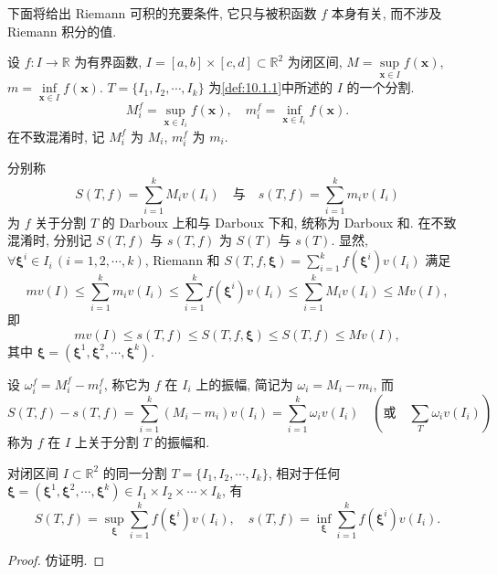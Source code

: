 下面将给出 Riemann 可积的充要条件, 它只与被积函数 $f$ 本身有关, 而不涉及 Riemann 积分的值.

设 $f\colon I \to \mathbb{R}$ 为有界函数, $I = [a, b] \times [c, d] \subset \mathbb{R}^2$ 为闭区间, $M = \sup\limits_{\boldsymbol{x} \in I} f(\boldsymbol{x})$, $m = \inf\limits_{\boldsymbol{x} \in I} f(\boldsymbol{x})$. $T = \{I_1, I_2, \cdots, I_k\}$ 为\cref{def:10.1.1}中所述的 $I$ 的一个分割.
\[
  M_{i}^{f} = \sup_{\boldsymbol{x} \in I_{i}} f(\boldsymbol{x}), \quad m_{i}^{f} = \inf_{\boldsymbol{x} \in I_{i}} f(\boldsymbol{x}).
\]
在不致混淆时, 记 $M_{i}^{f}$ 为 $M_{i}$, $m_{i}^{f}$ 为 $m_{i}$.

分别称
\[
  S(T, f) = \sum_{i=1}^{k} M_{i} v(I_{i}) \quad\text{与}\quad s(T, f) = \sum_{i=1}^{k} m_{i} v(I_{i})
\]
为 $f$ 关于分割 $T$ 的 Darboux 上和与 Darboux 下和, 统称为 Darboux 和. 在不致混淆时, 分别记 $S(T, f)$ 与 $s(T, f)$ 为 $S(T)$ 与 $s(T)$. 显然, $\forall \boldsymbol{\xi}^{i} \in I_{i}\,(i = 1, 2, \cdots, k)$, Riemann 和 $S(T, f, \boldsymbol{\xi}) = \sum\limits_{i=1}^{k} f(\boldsymbol{\xi}^{i}) v(I_{i})$ 满足
\[
  m v(I) \leqslant \sum_{i=1}^{k} m_{i} v(I_{i}) \leqslant \sum_{i=1}^{k} f(\boldsymbol{\xi}^{i}) v(I_{i}) \leqslant \sum_{i=1}^{k} M_{i} v(I_{i}) \leqslant M v(I),
\]
即
\[
  m v(I) \leqslant s(T, f) \leqslant S(T, f, \boldsymbol{\xi}) \leqslant S(T, f) \leqslant M v(I),
\]
其中 $\boldsymbol{\xi} = (\boldsymbol{\xi}^{1}, \boldsymbol{\xi}^{2}, \cdots, \boldsymbol{\xi}^{k})$.

设 $\omega_{i}^{f} = M_{i}^{f} - m_{i}^{f}$, 称它为 $f$ 在 $I_{i}$ 上的振幅, 简记为 $\omega_{i} = M_{i} - m_{i}$, 而
\[
  S(T, f) - s(T, f) = \sum_{i=1}^{k}(M_{i} - m_{i}) v(I_{i}) = \sum_{i=1}^{k} \omega_{i} v(I_{i}) \quad \left(\text{或}\quad \sum_{T} \omega_{i} v(I_{i})\right)
\]
称为 $f$ 在 $I$ 上关于分割 $T$ 的振幅和.

\begin{lemma}\label{lem:10.1.1}
对闭区间 $I \subset \mathbb{R}^2$ 的同一分割 $T = \{I_1, I_2, \cdots, I_k\}$, 相对于任何 $\boldsymbol{\xi} = (\boldsymbol{\xi}^1, \boldsymbol{\xi}^2, \cdots, \boldsymbol{\xi}^k) \in I_1 \times I_2 \times \cdots \times I_k$, 有
\[
  S(T, f) = \sup_{\boldsymbol{\xi}} \sum_{i=1}^{k} f(\boldsymbol{\xi}^{i}) v(I_{i}), \quad s(T, f) = \inf_{\boldsymbol{\xi}} \sum_{i=1}^{k} f(\boldsymbol{\xi}^{i}) v(I_{i}).
\]
\end{lemma}

\begin{proof}
仿证明.
\end{proof}

